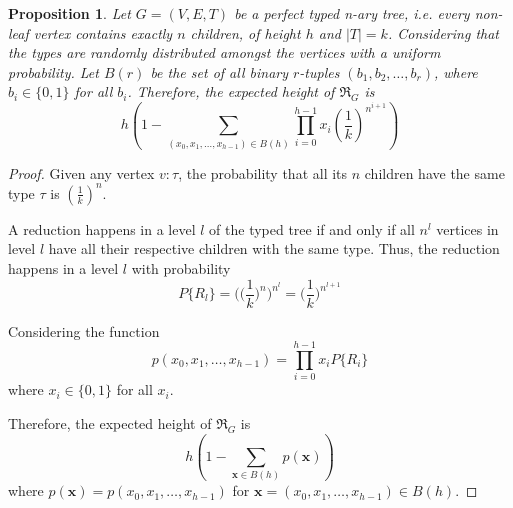 \documentclass[preprint,12pt]{elsarticle}
\theoremstyle{plain}
\newtheorem{prop}[theorem]{Proposition}
\newcommand\tyv[2]{#1\!\!:\!\!#2}
\begin{document}
\begin{prop}
Let $G = (V,E,T)$ be a perfect typed n-ary tree, i.e. every non-leaf vertex contains exactly $n$ children,
of height $h$ and $|T| = k$.
Considering that the types are randomly distributed amongst the vertices with a uniform probability.
Let $B(r)$ be the set of all binary $r$-tuples $(b_1, b_2, \ldots, b_r)$,
where $b_i\in\{0,1\}$ for all $b_i$.
Therefore, the expected height of $\Re_G$ is
\[
h\left(1-\sum_{(x_0,x_1,\ldots,x_{h-1})\in B(h)} \prod_{i=0}^{h-1} x_i (\frac{1}{k})^{n^{i+1}}\right)
\]
\end{prop}
\begin{proof}
Given any vertex $\tyv{v}{\tau}$, the probability that all its $n$ children have
the same type $\tau$ is $(\frac{1}{k})^n$.

A reduction happens in a level $l$ of the typed tree if and only if all $n^l$ vertices 
in level $l$ have all their respective children with the same type.
Thus, the reduction happens in a level $l$ with probability
\[
P\{R_l\} = \Big(\Big(\frac{1}{k}\Big)^n\Big)^{n^l} = \Big(\frac{1}{k}\Big)^{n^{l+1}}
\]

Considering the function
\[
p(x_0, x_1, \ldots, x_{h-1}) = \prod_{i=0}^{h-1} x_i P\{R_i\}
\]
where $x_i\in\{0,1\}$ for all $x_i$.

Therefore, the expected height of $\Re_G$ is
\[
h\left(1-\sum_{\mathbf{x}\in B(h)} p(\mathbf{x})\right)
\]
where $p(\mathbf{x})=p(x_0, x_1, \ldots, x_{h-1})$ for
$\mathbf{x}=(x_0, x_1, \ldots, x_{h-1})\in B(h)$.
\end{proof}
\end{document}
